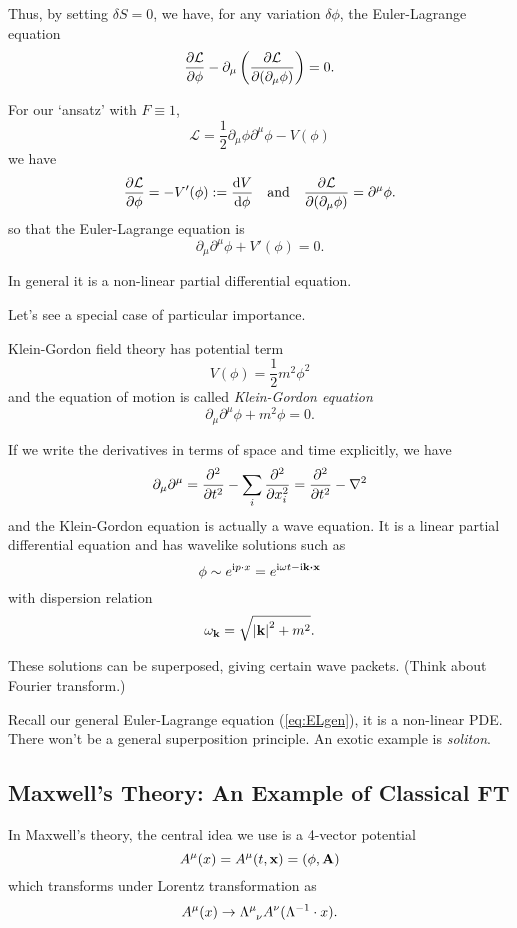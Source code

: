 \documentclass[a4paper,11pt]{article}
\begin{document}
	Thus, by setting $\delta S = 0$, we have, for any variation $\delta \phi$, the Euler-Lagrange equation
	\begin{equation}
		\pdv{\mathcal{L}}{\phi} - \partial_\mu \left( \pdv{\mathcal{L}}{(\partial_\mu \phi)} \right) = 0.
	\end{equation}

	For our `ansatz' with $F \equiv 1$, 
	\begin{equation}
		\mathcal{L} = \frac{1}{2} \partial_\mu \phi \partial^\mu \phi - V(\phi)
	\end{equation}
	we have
	\[
		\pdv{\mathcal{L}}{\phi} = - V'(\phi) := \dv{V}{\phi} \quad \text{and} \quad \pdv{\mathcal{L}}{(\partial_\mu \phi)} = \partial^\mu \phi.
	\]
	so that the Euler-Lagrange equation is
	\begin{equation}
		\partial_\mu \partial^\mu \phi + V'(\phi) = 0.
		\label{eq:ELgen}
	\end{equation}
	
	In general it is a non-linear partial differential equation.

	Let's see a special case of particular importance.
	\begin{ex}
		Klein-Gordon field theory has potential term
		\[
			V(\phi) = \frac{1}{2} m^2 \phi^2
		\]
		and the equation of motion is called \emph{Klein-Gordon equation}
		\begin{equation}
			\boxed{\partial_\mu \partial^\mu \phi + m^2 \phi = 0}.
		\end{equation}

		If we write the derivatives in terms of space and time explicitly, we have
		\[
			\partial_\mu \partial^\mu = \pdv[2]{t} - \sum_i \pdv[2]{x_i} = \pdv[2]{t} - \laplacian
		\]
		and the Klein-Gordon equation is actually a wave equation. It is a linear partial differential equation and has wavelike solutions such as 
		\[
			\phi \sim e^{\mathrm{i} p \cdot x} = e^{\mathrm{i} \omega t - \mathrm{i} \vb k \vdot \vb x}
		\]
		with dispersion relation
		\[
			\omega_{\vb k} = \sqrt{\abs{\vb k}^2 + m^2}.
		\]
		
		These solutions can be superposed, giving certain wave packets. (Think about Fourier transform.)
	\end{ex}

	
	Recall our general Euler-Lagrange equation (\ref{eq:ELgen}), it is a non-linear PDE. There won't be a general superposition principle. An exotic example is \emph{soliton}.
	
	\subsection{Maxwell's Theory: An Example of Classical FT}
	In Maxwell's theory, the central idea we use is a 4-vector potential
	\begin{equation*}
		A^\mu (x) = A^\mu(t, \vb x) = (\phi , \vb A)
	\end{equation*}
	which transforms under Lorentz transformation as 
	\begin{equation}
		A^\mu(x) \to \LT{\mu}{\nu} A^\nu (\Lambda^{-1} \cdot x).
	\end{equation}
\end{document}
